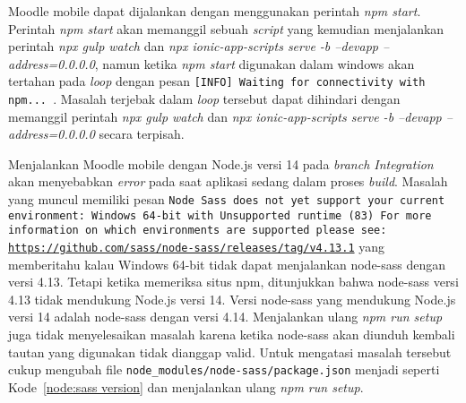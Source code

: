 Moodle mobile dapat dijalankan dengan menggunakan perintah \textit{npm start}.  Perintah \textit{npm start} akan memanggil sebuah \textit{script} yang kemudian menjalankan perintah \textit{npx gulp watch} dan \textit{npx ionic-app-scripts serve -b --devapp --address=0.0.0.0}, namun ketika \textit{npm start} digunakan dalam windows akan tertahan pada \textit{loop} dengan pesan \texttt{[INFO] Waiting for connectivity with npm...	}. Masalah terjebak dalam \textit{loop} tersebut dapat dihindari dengan memanggil perintah \textit{npx gulp watch} dan \textit{npx ionic-app-scripts serve -b --devapp --address=0.0.0.0} secara terpisah. 

Menjalankan Moodle mobile dengan Node.js versi 14 pada \textit{branch Integration} akan menyebabkan \textit{error} pada saat aplikasi sedang dalam proses \textit{build}. Masalah yang muncul memiliki pesan \texttt{Node Sass does not yet support your current environment: Windows 64-bit with Unsupported runtime (83)
For more information on which environments are supported please see:
\url{https://github.com/sass/node-sass/releases/tag/v4.13.1}} yang memberitahu kalau Windows 64-bit tidak dapat menjalankan node-sass dengan versi 4.13. Tetapi ketika memeriksa situs npm, ditunjukkan bahwa node-sass versi 4.13 tidak mendukung Node.js versi 14. Versi node-sass yang mendukung Node.js versi 14 adalah node-sass dengan versi 4.14\cite{node:sass}. Menjalankan ulang \textit{npm run setup} juga tidak menyelesaikan masalah karena ketika node-sass akan diunduh kembali tautan yang digunakan tidak dianggap valid. Untuk mengatasi masalah tersebut cukup mengubah file \texttt{node\_modules/node-sass/package.json} menjadi seperti \mbox{Kode \ref{node:sass version}} dan menjalankan ulang  \textit{npm run setup}.


